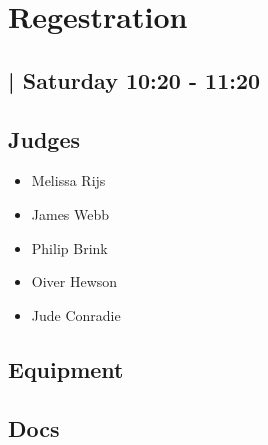 \documentclass[10pt]{article}
\begin{document}
		\begin{minipage}{\linewidth}
		\setcounter{section}{17}
	\section{Regestration }
	\subsection*{ | Saturday 10:20 - 11:20}

	

	\begin{multicols}{2}
	\subsection*{\faUsers \: Judges}
	\begin{itemize}
			\item Melissa Rijs
			\item James Webb
			\item Philip Brink
			\item Oiver Hewson
			\item Jude Conradie
		\end{itemize}
	\columnbreak
	\subsection*{\faWrench \: Equipment}
	        \vfill\null
        \subsection*{\faFile \: Docs}
     	\end{multicols}


	\vspace{1cm}
	\end{minipage}
\end{document}
